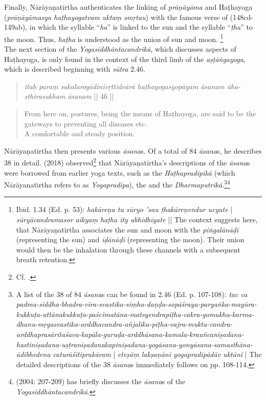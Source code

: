 Finally, Nārāyaṇatīrtha authenticates the linking of \textit{prāṇāyāma} and Haṭhayoga (\textit{prāṇāyāmasya haṭhayogatvam uktaṃ smṛtau}) with the famous verse of  (148cd-149ab), in which the syllable ``\textit{ha}'' is linked to the sun and the syllable ``\textit{ṭha}'' to the moon. Thus, \textit{haṭha} is understood as the union of sun and moon. \footnote{Ibid. 1.34 (Ed. p. 53): \textit{hakāreṇa tu sūryo 'sau ṭhakāreṇendur ucyate} | \textit{sūryācandramasor aikyaṃ haṭha ity abhidhīyate} || The context suggests here, that Nārāyaṇatīrtha associates the sun and moon with the \textit{piṅgalānāḍī} (representing the sun) and \textit{iḍānāḍī} (representing the moon). Their union would then be the inhalation through these channels with a subsequent breath retention.}\\

The next section of the \textit{Yogasiddhāntacandrikā}, which discusses aspects of Haṭhayoga, is only found in the context of the third limb of the \textit{aṣṭāṅgayoga}, which is described beginning with \textit{sūtra} 2.46.

\begin{quote} \textit{itaḥ paraṃ sakalarogādinivṛttidvārā haṭhayogasyopāyam āsanam āha- \\
sthirasukham āsanam} || 46 || \end{quote}
\begin{quote} From here on, postures, being the means of Haṭhayoga, are said to be the gateways to preventing all diseases etc. \\
A comfortable and steady position.
\end{quote}

Nārāyaṇatīrtha then presents various \textit{āsana}s. Of a total of 84 \textit{āsana}s, he describes 38 in detail. \citeauthor{birch2018proliferation} (2018) observed\footnote{Cf. \citeauthor[2018: 105, n. 9]{birch2018proliferation}.} that Nārāyaṇatīrtha's descriptions of the \textit{āsana}s were borrowed from earlier yoga texts, such as the \textit{Haṭhapradīpikā} (which Nārāyanatı̄rtha refers to as \textit{Yogapradīpa}), the  and the \textit{Dharmaputrikā}.\footnote{A list of the 38 of 84 \textit{āsana}s can be found in  2.46 (Ed. p. 107-108): \textit{tac ca padma-siddha-bhadra-vīra-svastika-siṃha-daṇḍa-sopāśraya-paryaṅka-mayūra-kukkuṭa-uttānakukkuṭa-paścimatāna-matsyendrapīṭha-cakra-gomukha-karma-dhanu-mṛgasvastika-arddhacandra-añjalika-pīṭha-vajra-mukta-candra-arddhaprasāritaśava-kapāla-guruḍa-arddhāsana-kamala-krauñcaniṣadana-hastiniṣadana-uṣṭraniṣadanakapiniṣadana-yogāsana-yonyāsana-samasthāna-ādibhedena caturāśītiprakāram} | \textit{eteṣāṃ lakṣaṇāni yogapradīpādāv uktāni} | The detailed descriptions of the 38 \textit{āsana}s immediately follows on pp. 108-114.}\footnote{\citeauthor{penna2004} (2004: 207-209) has briefly discusses the \textit{āsana}s of the \textit{Yogasiddhāntacandrikā}.}

